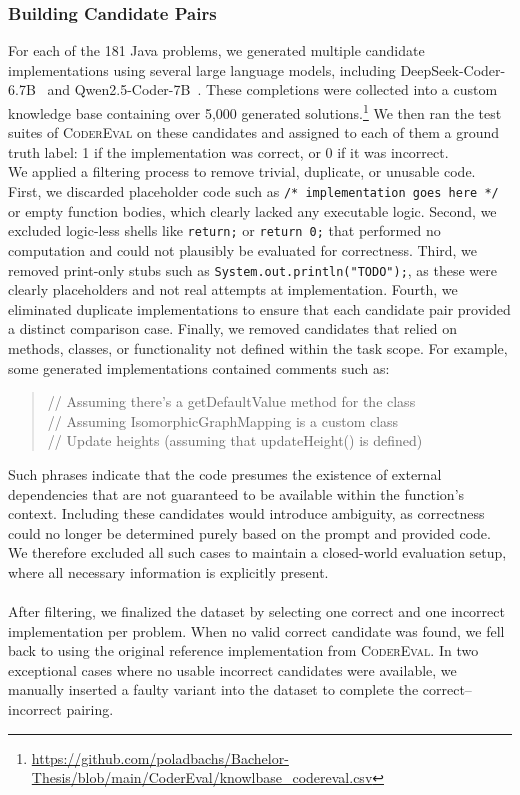 \documentclass[a4paper]{usiinfbachelorproject}
\begin{document}
\subsubsection{Building Candidate Pairs}\label{sec:judgments}
For each of the 181 Java problems, we generated multiple candidate implementations using several large language models, including DeepSeek-Coder-6.7B~\cite{deepseek2024report} and Qwen2.5-Coder-7B~\cite{qwen2024report}. These completions were collected into a custom knowledge base containing over 5,000 generated solutions.\footnote{\url{https://github.com/poladbachs/Bachelor-Thesis/blob/main/CoderEval/knowlbase_codereval.csv}} We then ran the test suites of \textsc{CoderEval} on these candidates and assigned to each of them a ground truth label: 1 if the implementation was correct, or 0 if it was incorrect.
\\[2pt]
We applied a filtering process to remove trivial, duplicate, or unusable code. First, we discarded placeholder code such as \texttt{/* implementation goes here */} or empty function bodies, which clearly lacked any executable logic. Second, we excluded logic-less shells like \texttt{return;} or \texttt{return 0;} that performed no computation and could not plausibly be evaluated for correctness. Third, we removed print-only stubs such as \texttt{System.out.println("TODO");}, as these were clearly placeholders and not real attempts at implementation. Fourth, we eliminated duplicate implementations to ensure that each candidate pair provided a distinct comparison case. Finally, we removed candidates that relied on methods, classes, or functionality not defined within the task scope. For example, some generated implementations contained comments such as:
\begin{quote}\ttfamily\small
// Assuming there's a getDefaultValue method for the class\\
// Assuming IsomorphicGraphMapping is a custom class\\
// Update heights (assuming that updateHeight() is defined)
\end{quote}
Such phrases indicate that the code presumes the existence of external dependencies that are not guaranteed to be available within the function's context. Including these candidates would introduce ambiguity, as correctness could no longer be determined purely based on the prompt and provided code. We therefore excluded all such cases to maintain a closed-world evaluation setup, where all necessary information is explicitly present.\\
\\[2pt]
After filtering, we finalized the dataset by selecting one correct and one incorrect implementation per problem. When no valid correct candidate was found, we fell back to using the original reference implementation from \textsc{CoderEval}. In two exceptional cases where no usable incorrect candidates were available, we manually inserted a faulty variant into the dataset to complete the correct–incorrect pairing.
\end{document}
